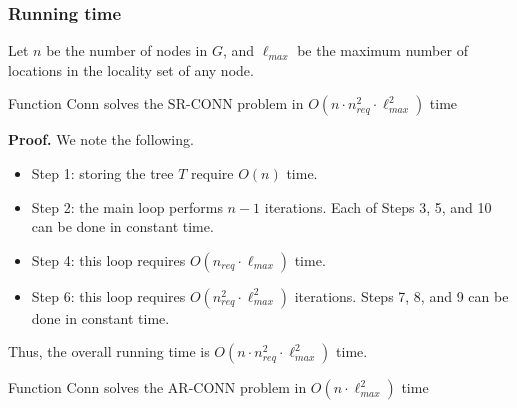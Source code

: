 \documentclass{beamer}
\newcommand{\ARCONN}   { {\mathrm {AR\mbox{-}CONN}} }
\newcommand{\SRCONN}   { {\mathrm {SR\mbox{-}CONN}} }
\newcommand{\fConn}   	{ {\mathrm {Conn}} }
\newcommand{\nReq}    { {n_{req}} }
\begin{document}
\begin{frame}
\frametitle{Running time}
Let $n$ be the number of nodes in $G$, and $\ell_{max}$ be the maximum
number of locations in the locality set of any node.

\begin{theorem}
\normalfont
    Function $\fConn$ solves the $\SRCONN$ problem in
    $O(n \cdot n_{req}^2  \cdot \ell_{max}^2)$ time
\end{theorem}
{\bf Proof.}
We note the following.
\begin{itemize}
\item   Step 1: storing the tree $T$ require $O(n)$ time.

\item	Step 2: the main loop performs $n-1$ iterations.
	Each of Steps 3, 5, and 10 can be done in constant time.

\item	Step 4: this loop requires $O(\nReq \cdot \ell_{max})$ time.

\item	Step 6: this loop requires $O(n_{req}^2 \cdot \ell_{max}^2)$ iterations.
	Steps 7, 8, and 9 can be done in constant time.
\end{itemize}
Thus, the overall running time is $O(n \cdot n_{req}^2  \cdot \ell_{max}^2)$ time.

\begin{theorem}
\normalfont
    Function $\fConn$ solves the $\ARCONN$ problem in
    $O(n \cdot \ell_{max}^2)$ time

\end{theorem}
\end{frame}

\end{document}
